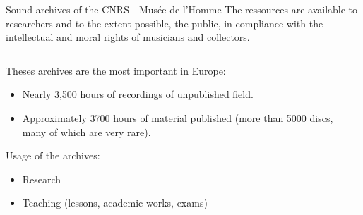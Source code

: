 \documentclass[final, hyperref, table]{beamer}
\begin{document}
\begin{frame}[containsverbatim]{}
\begin{columns}[T]
\begin{column}[T]{.49\linewidth}
      \begin{block}{Sound archives of the CNRS - Musée de l'Homme}
        The ressources are available to researchers and to the extent possible, the public, in compliance with the intellectual and moral rights of musicians and collectors.
        \begin{columns}[T]
          \begin{column}{0.27\linewidth}
            Theses archives are the most important in Europe:
            \begin{itemize}
            \item Nearly 3,500 hours of recordings of unpublished field.
            \item Approximately 3700 hours of material published (more than
              5000 discs, many of which are very rare).
            \end{itemize}
            Usage of the archives:
            \begin{itemize}
            \item Research
            \item Teaching (lessons, academic works, exams)
            \end{itemize}
          \end{column}
          \begin{column}{0.7\linewidth}
            \centering
          \end{column}
        \end{columns}

      \end{block}
      
      
    \end{column}

\end{columns}
\end{frame}
\end{document}
